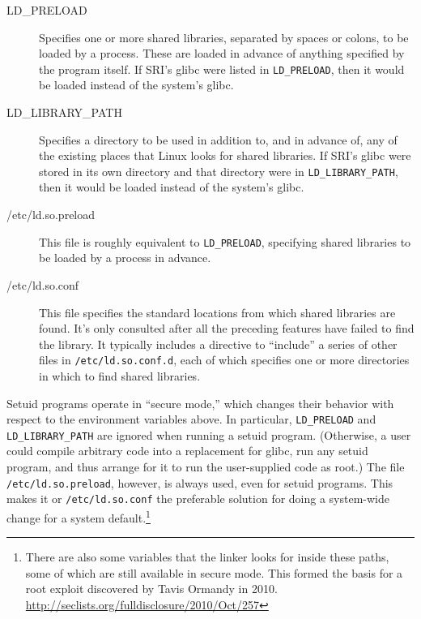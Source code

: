 \begin{description}

\item[LD\_PRELOAD]
Specifies one or more shared libraries, separated by spaces or colons,
to be loaded by a process. These are loaded in advance of anything
specified by the program itself. If SRI's glibc were listed in
\texttt{LD\_PRELOAD}, then it would be loaded instead of the system's
glibc.

\item[LD\_LIBRARY\_PATH]
Specifies a directory to be used in addition to, and in advance of,
any of the existing places that Linux looks for shared libraries. If
SRI's glibc were stored in its own directory and that directory
were in \texttt{LD\_LIBRARY\_PATH}, then it would be loaded instead of
the system's glibc.

\item[/etc/ld.so.preload]
This file is roughly equivalent to \texttt{LD\_PRELOAD}, specifying
shared libraries to be loaded by a process in advance.

\item[/etc/ld.so.conf]
This file specifies the standard locations from which shared libraries
are found. It's only consulted after all the preceding features have
failed to find the library. It typically includes a directive to
``include'' a series of other files in \texttt{/etc/ld.so.conf.d}, each
of which specifies one or more directories in which to find shared
libraries.

\end{description}

Setuid programs operate in ``secure mode,'' which changes their
behavior with respect to the environment variables above. In
particular, \texttt{LD\_PRELOAD} and \texttt{LD\_LIBRARY\_PATH} are ignored
when running a setuid program. (Otherwise, a user could compile
arbitrary code into a replacement for glibc, run any setuid
program, and thus arrange for it to run the user-supplied code as
root.) The file \texttt{/etc/ld.so.preload}, however, is always used,
even for setuid programs. This makes it or \texttt{/etc/ld.so.conf} the
preferable solution for doing a system-wide change for a system
default.\footnote{There are also some variables that the linker looks
for inside these paths, some of which are still available in secure
mode. This formed the basis for a root exploit discovered by Tavis
Ormandy in
2010. \url{http://seclists.org/fulldisclosure/2010/Oct/257}}




